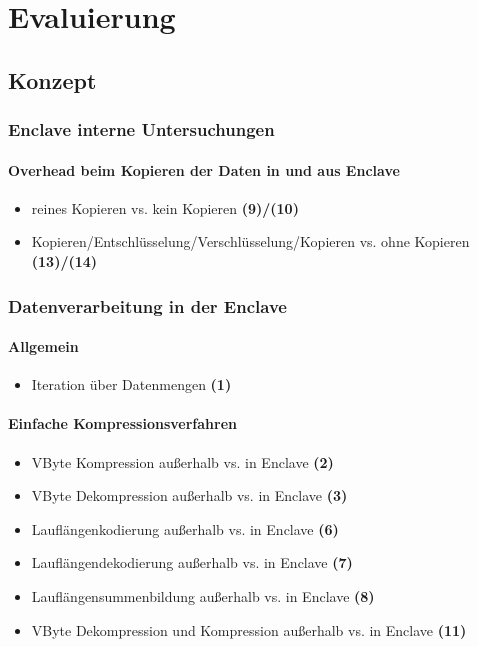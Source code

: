 
\chapter{Evaluierung}

\section{Konzept}

\subsection{Enclave interne Untersuchungen}
\subsubsection{Overhead beim Kopieren der Daten in und aus Enclave}
\begin{itemize}
	\item reines Kopieren vs. kein Kopieren \textbf{(9)/(10)}
	\item Kopieren/Entschlüsselung/Verschlüsselung/Kopieren vs. ohne Kopieren \textbf{(13)/(14)} 
\end{itemize}

\subsection{Datenverarbeitung in der Enclave}
\subsubsection{Allgemein}
\begin{itemize}
	\item Iteration über Datenmengen \textbf{(1)}
\end{itemize}
\subsubsection{Einfache Kompressionsverfahren}
\begin{itemize}
	\item VByte Kompression außerhalb vs. in Enclave \textbf{(2)}
	\item VByte Dekompression außerhalb vs. in Enclave \textbf{(3)}
	\item Lauflängenkodierung außerhalb vs. in Enclave \textbf{(6)}
	\item Lauflängendekodierung außerhalb vs. in Enclave \textbf{(7)}
	\item Lauflängensummenbildung außerhalb vs. in Enclave \textbf{(8)}
	\item VByte Dekompression und Kompression außerhalb vs. in Enclave \textbf{(11)}
\end{itemize}
